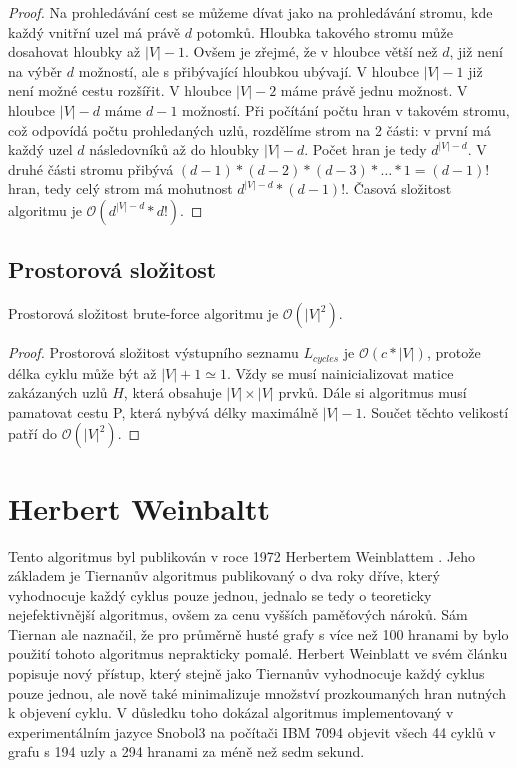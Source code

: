         \begin{proof}
            Na prohledávání cest se můžeme dívat jako na prohledávání stromu, kde každý vnitřní uzel má právě $d$ potomků. Hloubka takového stromu může dosahovat hloubky až $|V| - 1$. Ovšem je zřejmé, že v hloubce větší než $d$, již není na výběr $d$ možností, ale s přibývající hloubkou ubývají. V hloubce $|V| -1$ již není možné cestu rozšířit. V hloubce $|V| -2$ máme právě jednu možnost. V hloubce $|V| -d$ máme $d - 1$ možností. Při počítání počtu hran v takovém stromu, což odpovídá počtu prohledaných uzlů, rozdělíme strom na 2 části: v první má každý uzel $d$ následovníků až do hloubky $|V| - d$. Počet hran je tedy $d^{|V|-d}$. V druhé části stromu přibývá $(d-1) * (d-2) * (d-3) * \dots  * 1 = (d-1)!$ hran, tedy celý strom má mohutnost $d^{|V|-d} * (d-1)!$. Časová složitost algoritmu je $\mathcal{O}(d^{|V|-d} * d!)$.
        \end{proof}

    \section{Prostorová složitost}
        \begin{theorem}
            Prostorová složitost  brute-force algoritmu je $\mathcal{O}(|V|^{2})$.
        \end{theorem}

        \begin{proof}
            Prostorová složitost výstupního seznamu $L_{cycles}$ je $\mathcal{O}(c * |V|)$, protože délka cyklu může být až $|V| + 1 \simeq 1$. Vždy se musí nainicializovat matice zakázaných uzlů $H$, která obsahuje $|V| \times |V|$ prvků. Dále si algoritmus musí pamatovat cestu P, která nybývá délky maximálně $|V|-1$. Součet těchto velikostí patří do $\mathcal{O}(|V|^{2})$.
        \end{proof}

\chapter{Herbert Weinbaltt}
    \label{chapter:Algo2}
    Tento algoritmus byl publikován v roce 1972 Herbertem Weinblattem \cite{A_new_search_algorithm}. Jeho základem je Tiernanův algoritmus \cite{Tiernan} publikovaný o dva roky dříve, který vyhodnocuje každý cyklus pouze jednou, jednalo se tedy o teoreticky nejefektivnější algoritmus, ovšem za cenu vyšších paměťových nároků. Sám Tiernan ale naznačil, že pro průměrně husté grafy s více než 100 hranami by bylo použití tohoto algoritmus neprakticky pomalé. Herbert Weinblatt ve svém článku popisuje nový přístup, který stejně jako Tiernanův vyhodnocuje každý cyklus pouze jednou, ale nově také minimalizuje množství prozkoumaných hran nutných k objevení cyklu. V důsledku toho dokázal algoritmus implementovaný v experimentálním jazyce Snobol3 na počítači IBM 7094 objevit všech 44 cyklů v grafu s 194 uzly a 294 hranami za méně než sedm sekund.

